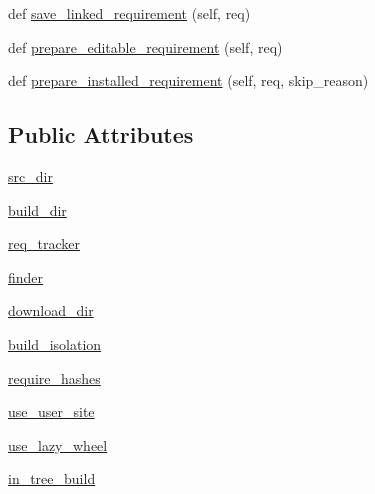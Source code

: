 \begin{DoxyCompactItemize}
\item 
def \hyperlink{classpip_1_1__internal_1_1operations_1_1prepare_1_1RequirementPreparer_a9ed8798a8b8c40af92a753c7851b709f}{save\+\_\+linked\+\_\+requirement} (self, req)
\item 
def \hyperlink{classpip_1_1__internal_1_1operations_1_1prepare_1_1RequirementPreparer_a49bae56966abd8173ed34ebf0612a563}{prepare\+\_\+editable\+\_\+requirement} (self, req)
\item 
def \hyperlink{classpip_1_1__internal_1_1operations_1_1prepare_1_1RequirementPreparer_ad78b3768deaacc67f0a9c4c9ef640595}{prepare\+\_\+installed\+\_\+requirement} (self, req, skip\+\_\+reason)
\end{DoxyCompactItemize}
\subsection*{Public Attributes}
\begin{DoxyCompactItemize}
\item 
\hyperlink{classpip_1_1__internal_1_1operations_1_1prepare_1_1RequirementPreparer_a3b03911c99e31032ac046f43f5e12aee}{src\+\_\+dir}
\item 
\hyperlink{classpip_1_1__internal_1_1operations_1_1prepare_1_1RequirementPreparer_a93f833daaa57d658c139553530967f4a}{build\+\_\+dir}
\item 
\hyperlink{classpip_1_1__internal_1_1operations_1_1prepare_1_1RequirementPreparer_a5eb08766a136d02155138d84c942d6d6}{req\+\_\+tracker}
\item 
\hyperlink{classpip_1_1__internal_1_1operations_1_1prepare_1_1RequirementPreparer_a89e868222c54eb36df489027e0be83ac}{finder}
\item 
\hyperlink{classpip_1_1__internal_1_1operations_1_1prepare_1_1RequirementPreparer_acf0adba9dd168d050c1ba87ac61c5ee8}{download\+\_\+dir}
\item 
\hyperlink{classpip_1_1__internal_1_1operations_1_1prepare_1_1RequirementPreparer_a53e52b0114bffe5935d05c3b63ea443a}{build\+\_\+isolation}
\item 
\hyperlink{classpip_1_1__internal_1_1operations_1_1prepare_1_1RequirementPreparer_aa8f605003b9a038167f777754f71f33c}{require\+\_\+hashes}
\item 
\hyperlink{classpip_1_1__internal_1_1operations_1_1prepare_1_1RequirementPreparer_ad70d699208bc934d03c389c44e53325b}{use\+\_\+user\+\_\+site}
\item 
\hyperlink{classpip_1_1__internal_1_1operations_1_1prepare_1_1RequirementPreparer_a75366151f809402f695cffbee0a35fd7}{use\+\_\+lazy\+\_\+wheel}
\item 
\hyperlink{classpip_1_1__internal_1_1operations_1_1prepare_1_1RequirementPreparer_a57817f94ce0461d2a8b465e83eed42fd}{in\+\_\+tree\+\_\+build}
\end{DoxyCompactItemize}


